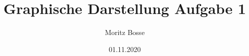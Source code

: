 

\author{Moritz Bosse}
\title{Graphische Darstellung Aufgabe 1}
\date{01.11.2020}


\begin{minipage}{\textwidth}
\maketitle
\tableofcontents
\end{minipage}
\ignorespacesafterend
\newpage



